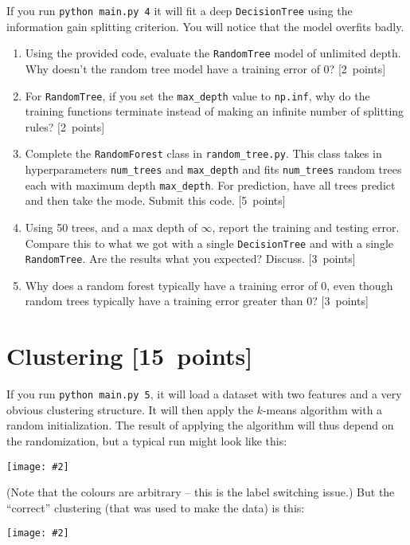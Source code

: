 \documentclass{article}
\newcommand{\blu}[1]{{\textcolor{blu}{#1}}}
\let\ask\blu
\newcommand\pts[1]{\textcolor{pointscolour}{[#1~points]}}
\newcommand{\centerfig}[2]{\begin{center}\texttt{[image: \#2]}\end{center}}
\begin{document}
    If you run \texttt{python main.py 4} it will fit a deep \texttt{DecisionTree}
    using the information gain splitting criterion. You will notice that the model overfits badly.




    \begin{enumerate}
        \item Using the provided code, evaluate the \texttt{RandomTree} model of unlimited depth. \ask{Why doesn't the random tree model have a training error of 0?} \pts{2}
        \item For \texttt{RandomTree}, if you set the \texttt{max\_depth} value to \texttt{np.inf}, \ask{why do the training functions terminate instead of making an infinite number of splitting rules?} \pts{2}
        \item Complete the \texttt{RandomForest} class in \texttt{random\string_tree.py}. This class takes in hyperparameters \texttt{num\string_trees} and \texttt{max\string_depth} and
        fits \texttt{num\string_trees} random trees each with maximum depth \texttt{max\string_depth}. For prediction, have all trees predict and then take the mode. \ask{Submit this code.} \pts{5}
        
        \item Using 50 trees, and a max depth of $\infty$, \ask{report the training and testing error}. Compare this to what we got with a single \texttt{DecisionTree} and with a single \texttt{RandomTree}. \ask{Are the results what you expected? Discuss.} \pts{3}
        \item \ask{Why does a random forest typically have a training error of 0, even though random trees typically have a training error greater than 0?} \pts{3}
    \end{enumerate}


    \clearpage
    \section{Clustering \pts{15}}

    If you run \verb|python main.py 5|, it will load a dataset with two features
    and a very obvious clustering structure. It will then apply the $k$-means algorithm
    with a random initialization. The result of applying the
    algorithm will thus depend on the randomization, but a typical run might look like this:
    \centerfig{.5}{figs/kmeans_basic.png}
    (Note that the colours are arbitrary -- this is the label switching issue.)
    But the ``correct'' clustering (that was used to make the data) is this:
    \centerfig{.5}{figs/kmeans_good.png}
\end{document}
